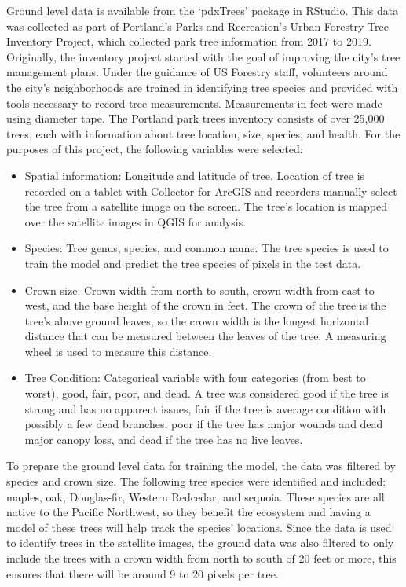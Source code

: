 \documentclass[12pt,twoside]{reedthesis}
\begin{document}
Ground level data is available from the `pdxTrees' package in RStudio. This data was collected as part of Portland's Parks and Recreation's Urban Forestry Tree Inventory Project, which collected park tree information from 2017 to 2019. Originally, the inventory project started with the goal of improving the city's tree management plans. Under the guidance of US Forestry staff, volunteers around the city's neighborhoods are trained in identifying tree species and provided with tools necessary to record tree measurements. Measurements in feet were made using diameter tape. The Portland park trees inventory consists of over 25,000 trees, each with information about tree location, size, species, and health. For the purposes of this project, the following variables were selected:
\begin{itemize}
\item
  Spatial information: Longitude and latitude of tree. Location of tree is recorded on a tablet with Collector for ArcGIS and recorders manually select the tree from a satellite image on the screen. The tree's location is mapped over the satellite images in QGIS for analysis.
\item
  Species: Tree genus, species, and common name. The tree species is used to train the model and predict the tree species of pixels in the test data.
\item
  Crown size: Crown width from north to south, crown width from east to west, and the base height of the crown in feet. The crown of the tree is the tree's above ground leaves, so the crown width is the longest horizontal distance that can be measured between the leaves of the tree. A measuring wheel is used to measure this distance.
\item
  Tree Condition: Categorical variable with four categories (from best to worst), good, fair, poor, and dead. A tree was considered good if the tree is strong and has no apparent issues, fair if the tree is average condition with possibly a few dead branches, poor if the tree has major wounds and dead major canopy loss, and dead if the tree has no live leaves.
\end{itemize}
To prepare the ground level data for training the model, the data was filtered by species and crown size. The following tree species were identified and included: maples, oak, Douglas-fir, Western Redcedar, and sequoia. These species are all native to the Pacific Northwest, so they benefit the ecosystem and having a model of these trees will help track the species' locations. Since the data is used to identify trees in the satellite images, the ground data was also filtered to only include the trees with a crown width from north to south of 20 feet or more, this ensures that there will be around 9 to 20 pixels per tree.
\end{document}
